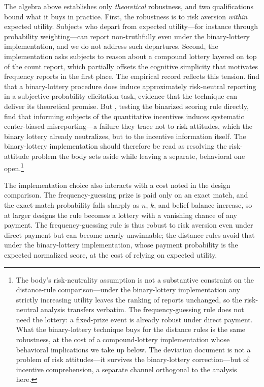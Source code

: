 The algebra above establishes only \emph{theoretical} robustness, and two qualifications bound what it buys in practice.
First, the robustness is to risk aversion \emph{within} expected utility.
Subjects who depart from expected utility---for instance through probability weighting---can report non-truthfully even under the binary-lottery implementation, and we do not address such departures.
Second, the implementation asks subjects to reason about a compound lottery layered on top of the count report, which partially offsets the cognitive simplicity that motivates frequency reports in the first place.
The empirical record reflects this tension.
\citet{Harrison2014} find that a binary-lottery procedure does induce approximately risk-neutral reporting in a subjective-probability elicitation task, evidence that the technique can deliver its theoretical promise.
But \citet{DanzVesterlundWilson2022}, testing the binarized scoring rule directly, find that informing subjects of the quantitative incentives induces systematic center-biased misreporting---a failure they trace not to risk attitudes, which the binary lottery already neutralizes, but to the incentive information itself.
The binary-lottery implementation should therefore be read as resolving the risk-attitude problem the body sets aside while leaving a separate, behavioral one open.\footnote{The body's risk-neutrality assumption is not a substantive constraint on the distance-rule comparison---under the binary-lottery implementation any strictly increasing utility leaves the ranking of reports unchanged, so the risk-neutral analysis transfers verbatim. The frequency-guessing rule does not need the lottery: a fixed-prize event is already robust under direct payment. What the binary-lottery technique buys for the distance rules is the same robustness, at the cost of a compound-lottery implementation whose behavioral implications we take up below. The deviation \citet{DanzVesterlundWilson2022} document is not a problem of risk attitudes---it survives the binary-lottery correction---but of incentive comprehension, a separate channel orthogonal to the analysis here.}

The implementation choice also interacts with a cost noted in the design comparison.
The frequency-guessing prize is paid only on an exact match, and the exact-match probability falls sharply as \(n\), \(k\), and belief balance increase, so at larger designs the rule becomes a lottery with a vanishing chance of any payment.
The frequency-guessing rule is thus robust to risk aversion even under direct payment but can become nearly unwinnable; the distance rules avoid that under the binary-lottery implementation, whose payment probability is the expected normalized score, at the cost of relying on expected utility.

